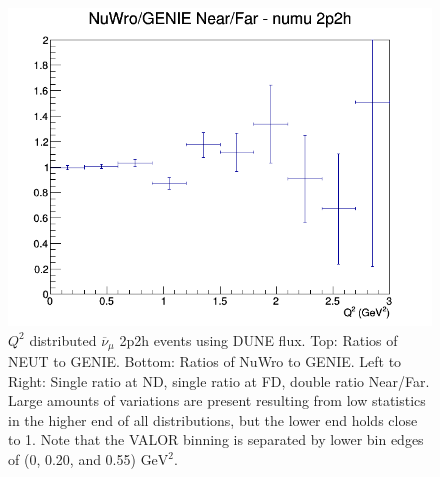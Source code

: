 \documentclass[12pt]{article}
\begin{document}
\begin{figure}[h]
\endminipage
{}
\includegraphics[width=\linewidth]{Q2/nominal/ratios/2p2h_NuWro_GENIE_numu_NF_Q2.png}
\endminipage
\caption{$Q^2$ distributed $\overline{\nu}_{\mu}$ 2p2h events using DUNE flux. Top: Ratios of NEUT to GENIE. Bottom: Ratios of NuWro to GENIE. Left to Right: Single ratio at ND, single ratio at FD, double ratio Near/Far. Large amounts of variations are present resulting from low statistics in the higher end of all distributions, but the lower end holds close to 1. Note that the VALOR binning is separated by lower bin edges of (0, 0.20, and 0.55) $\textrm{GeV}^2$.}
\label{fig:Q2_2p2h_numu_no_eff}
\end{figure}
\end{document}
